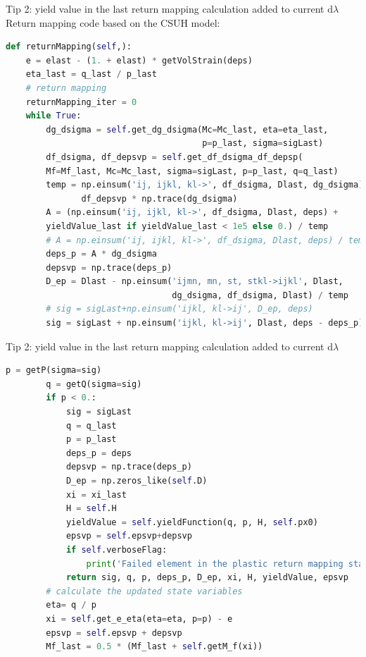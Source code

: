 \documentclass[aspectratio=169]{beamer}
\begin{document}
\begin{frame}[fragile]{Tip 2: yield value in the last return mapping calculation added to current $\mathrm{d} \lambda$}
	Return mapping code based on the CSUH model:
	\begin{lstlisting}[language=Python,basicstyle=\tiny]
def returnMapping(self,):
	e = elast - (1. + elast) * getVolStrain(deps)
	eta_last = q_last / p_last
	# return mapping
	returnMapping_iter = 0
	while True:
		dg_dsigma = self.get_dg_dsigma(Mc=Mc_last, eta=eta_last, 
		                               p=p_last, sigma=sigLast)
		df_dsigma, df_depsvp = self.get_df_dsigma_df_depsp(
		Mf=Mf_last, Mc=Mc_last, sigma=sigLast, p=p_last, q=q_last)
		temp = np.einsum('ij, ijkl, kl->', df_dsigma, Dlast, dg_dsigma) - \
			   df_depsvp * np.trace(dg_dsigma)
		A = (np.einsum('ij, ijkl, kl->', df_dsigma, Dlast, deps) +
		yieldValue_last if yieldValue_last < 1e5 else 0.) / temp
		# A = np.einsum('ij, ijkl, kl->', df_dsigma, Dlast, deps) / temp
		deps_p = A * dg_dsigma
		depsvp = np.trace(deps_p)
		D_ep = Dlast - np.einsum('ijmn, mn, st, stkl->ijkl', Dlast, 
		                         dg_dsigma, df_dsigma, Dlast) / temp
		# sig = sigLast+np.einsum('ijkl, kl->ij', D_ep, deps)
		sig = sigLast + np.einsum('ijkl, kl->ij', Dlast, deps - deps_p)
	\end{lstlisting}
\end{frame}


\begin{frame}[fragile]{Tip 2: yield value in the last return mapping calculation added to current $\mathrm{d} \lambda$}
	\begin{lstlisting}[language=Python,basicstyle=\tiny]
		p = getP(sigma=sig)
		q = getQ(sigma=sig)
		if p < 0.:
			sig = sigLast
			q = q_last
			p = p_last
			deps_p = deps
			depsvp = np.trace(deps_p)
			D_ep = np.zeros_like(self.D)
			xi = xi_last
			H = self.H
			yieldValue = self.yieldFunction(q, p, H, self.px0)
			epsvp = self.epsvp+depsvp
			if self.verboseFlag:
				print('Failed element in the plastic return mapping stage!')
			return sig, q, p, deps_p, D_ep, xi, H, yieldValue, epsvp
		# calculate the updated state variables
		eta= q / p
		xi = self.get_e_eta(eta=eta, p=p) - e
		epsvp = self.epsvp + depsvp
		Mf_last = 0.5 * (Mf_last + self.getM_f(xi))
	\end{lstlisting}
\end{frame}
\end{document}
